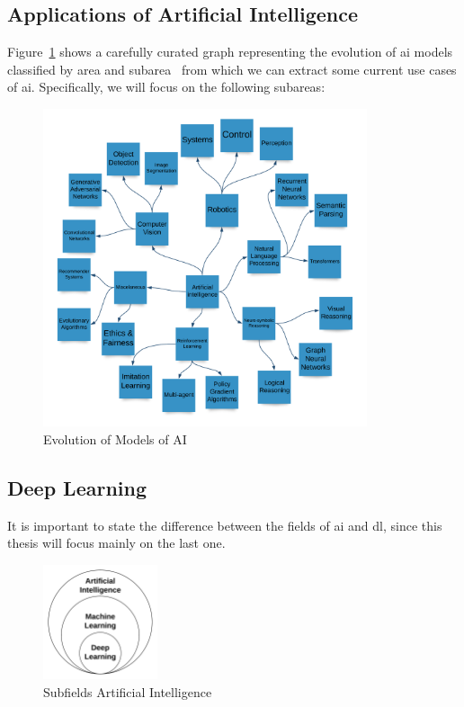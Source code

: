 \newpage

\subsection{Applications of Artificial Intelligence}

Figure~\ref{fig:state-art-ai} shows a carefully curated graph representing the evolution of \gls{ai} models classified by area and subarea~\cite{sotaAI} from which we can extract some current use cases of \gls{ai}. Specifically, we will focus on the following subareas:

\begin{figure}[H]
    \centering
    \caption{\label{fig:state-art-ai} Evolution of Models of AI}
    \includegraphics[width=0.85\textwidth]{figures/stoai.png}
\end{figure}

\newpage
\subsection{Deep Learning}

It is important to state the difference between the fields of \gls{ai} and \gls{dl}, since this thesis will focus mainly on the last one. 

\begin{figure}
    \centering
    \caption{\label{fig:difference-ml-dl} Subfields Artificial Intelligence}
    \includegraphics[width=0.3\textwidth]{figures/difference ml dl.png}
\end{figure}

